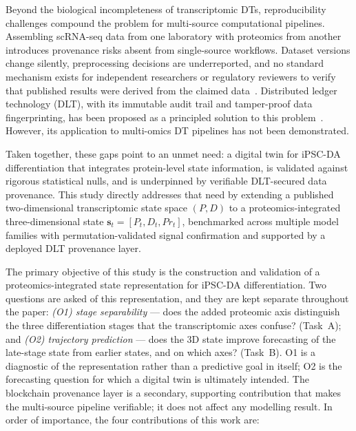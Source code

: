 \documentclass[5p,times,twocolumn]{elsarticle}
\newcommand{\rtag}[1]{}
\newenvironment{revblock}[1]{\par\rtag{#1}\ignorespaces}{\par}
\newcommand{\lang}[1]{#1}
\begin{document}
Beyond the biological incompleteness of transcriptomic DTs, reproducibility challenges compound the problem for multi-source computational pipelines.
Assembling scRNA-seq data from one laboratory with proteomics from another introduces provenance risks absent from single-source workflows. Dataset versions change silently, preprocessing decisions are underreported, and no standard mechanism exists for independent researchers or regulatory reviewers to verify that published results were derived from the claimed data~\cite{johns2023data}.
Distributed ledger technology (DLT), with its immutable audit trail and tamper-proof data fingerprinting, has been proposed as a principled solution to this problem~\cite{kuo2017blockchain}. However, its application to multi-omics DT pipelines has not been demonstrated.

Taken together, these gaps \lang{point to an unmet need}: a digital twin for iPSC-DA
differentiation that integrates protein-level state
information, is validated against rigorous statistical
nulls, and is underpinned by verifiable DLT-secured
data provenance.
This study directly addresses that need by extending
a published two-dimensional transcriptomic state
space $(P, D)$ to a proteomics-integrated
three-dimensional state
$\mathbf{s}_{t} = [P_{t}, D_{t}, Pr_{t}]$,
benchmarked across multiple model families with
permutation-validated signal confirmation and
supported by a deployed DLT provenance layer.

\begin{revblock}{R1.1,R2.1,R2.21}
The primary objective of this study is
  the construction and validation of a proteomics-integrated
  state representation for iPSC-DA differentiation. Two
  questions are asked of this representation, and they are
  kept separate throughout the paper:
  \textit{(O1) stage separability} --- does the added
  proteomic axis distinguish the three differentiation stages
  that the transcriptomic axes confuse? (Task~A); and
  \textit{(O2) trajectory prediction} --- does the 3D state
  improve forecasting of the late-stage state from earlier
  states, and on which axes? (Task~B).
  O1 is a diagnostic of the representation rather than a
  predictive goal in itself; O2 is the forecasting question
  for which a digital twin is ultimately intended.
  The blockchain provenance layer is a secondary, supporting
  contribution that makes the multi-source pipeline
  verifiable; it does not affect any modelling result.
  In order of importance, the four contributions of this
  work are:
\end{revblock}
\end{document}
